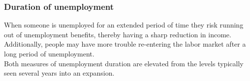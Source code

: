 \documentclass{report}
\begin{document}
{{{{{{{{{\begin{minipage}{0.76\textwidth}
\end{minipage}

\newpage

\begin{minipage}{0.76\textwidth} 

\subsubsection*{\color{black!70} \seriffont Duration of unemployment}

\small When someone is unemployed for an extended period of time they risk running out of unemployment benefits, thereby having a sharp reduction in income. Additionally, people may have more trouble re-entering the labor market after a long period of unemployment. \\

 
 Both measures of unemployment duration are elevated from the levels typically seen several years into an expansion.

\end{minipage}\\

\vspace{2mm}

}}}}}}}}}
\end{document}

